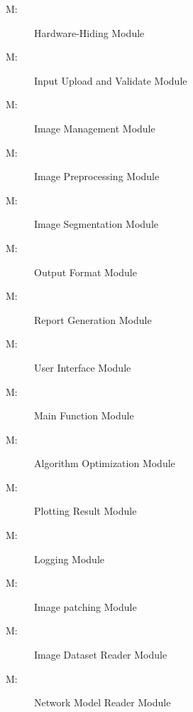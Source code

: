 \documentclass[12pt, titlepage]{article}
\newcounter{mnum}
\newcommand{\mthemnum}{M\themnum}
\begin{document}
\begin{description}
\item [ \mthemnum \label{1_mHH}:] Hardware-Hiding Module
\item [ \mthemnum \label{2_mHH}:] Input Upload and Validate Module
\item [ \mthemnum \label{3_mHH}:] Image Management Module
\item [ \mthemnum \label{4_mHH}:] Image Preprocessing Module
\item [ \mthemnum \label{5_mHH}:] Image Segmentation Module
\item [ \mthemnum \label{6_mHH}:] Output Format Module
\item [ \mthemnum \label{7_mHH}:] Report Generation Module
\item [ \mthemnum \label{8_mHH}:] User Interface Module
\item [ \mthemnum \label{9_mHH}:] Main Function Module
\item [ \mthemnum \label{10_mHH}:] Algorithm Optimization Module
\item [ \mthemnum \label{11_mHH}:] Plotting Result Module
\item [ \mthemnum \label{12_mHH}:] Logging Module
\item [ \mthemnum \label{13_mHH}:] Image patching Module 
\item [ \mthemnum \label{14_mHH}:] Image Dataset Reader Module 
\item [ \mthemnum \label{15_mHH}:] Network Model Reader Module 

\end{description}
\end{document}
